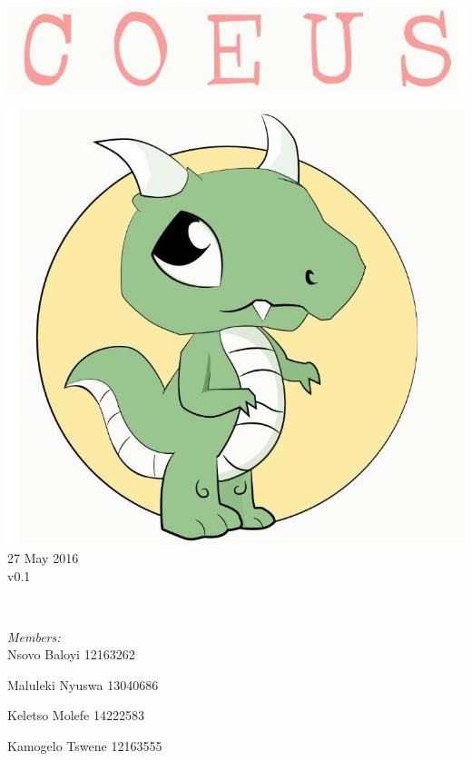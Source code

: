 \documentclass[a4paper,12pt]{article}
\begin{document}
\begin{titlepage}
	\includegraphics[width=\textwidth]{name} \\[1cm]
	\begin{minipage}{0.4\textwidth}
	\begin{flushleft} \large
	\includegraphics[width=\textwidth]{logo} \\[0.5cm]
	{\large 27 May 2016}\\
	{\large v0.1}
	\end{flushleft}
	\end{minipage}
	~
	\begin{minipage}{0.5\textwidth}
	\begin{flushright} \large
	\emph{Members:}\\%
	Nsovo Baloyi 12163262

	Maluleki Nyuswa 13040686
	
	Keletso Molefe 14222583
	
	Kamogelo Tswene 12163555

	\end{flushright}
	\end{minipage}\\[4cm]
\end{titlepage}
\end{document}
